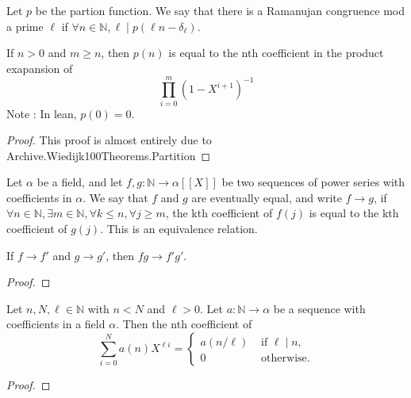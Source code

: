 \begin{definition}
  \label{def:ramanujan_congruence}
  \leanok
  Let $p$ be the partion function. We say that there is a Ramanujan congruence mod a prime $\ell$ if 
  $\forall n \in \mathbb{N}, \ell \mid p (\ell n - \delta_\ell).$
\end{definition}


\begin{theorem}
  \label{thm:partitionProduct_eq}
  \leanok
  If $n > 0$ and $m \ge n$, then $p (n)$ is equal to the nth coefficient in the product exapansion of
  \[ \prod_{i = 0}^{m} (1 - X^{i + 1})^{-1} \]
  Note : In lean, $p (0) = 0$.
\end{theorem}
\begin{proof}
  \leanok
  This proof is almost entirely due to Archive.Wiedijk100Theorems.Partition
\end{proof}


\begin{definition} 
  \label{def:eventuallyEq}
  \leanok
  Let $\alpha$ be a field, and let $f, g : \mathbb{N} \to \alpha [[X]]$ be two sequences of power series with coefficients in $\alpha$.
  We say that $f$ and $g$ are eventually equal, and write $f \longrightarrow g$, if
  $\forall n \in \mathbb{N}, \exists m \in \mathbb{N}, \forall k \le n, \forall j \ge m$, 
  the kth coefficient of $f(j)$ is equal to the kth coefficient of $g(j)$. This is an equivalence relation.
\end{definition}

\begin{theorem}
  \label{thm:eventuallyEq_mul}
  \leanok
  If $f \longrightarrow f'$ and $g \longrightarrow g'$, then $f g \longrightarrow f' g'$.
\end{theorem}
\begin{proof}
  \leanok
\end{proof}


\begin{lemma}
  \label{lem:coeff_sum_X_pow_mul}
  \leanok
  Let $n, N, \ell \in \mathbb{N}$ with $n < N$ and $\ell > 0$. Let $a : \mathbb{N} \to \alpha$ be a sequence with coefficients in a field $\alpha$.
  Then the nth coefficient of 
  \[ \sum_{i = 0}^{N} a (n) X ^ {\ell i} = 
      \begin{cases}
        a (n / \ell) & \text{ if } \ell \mid n, \\
        0 & \text{ otherwise.}
      \end{cases} \]

\end{lemma}
\begin{proof}
  \leanok
\end{proof}


